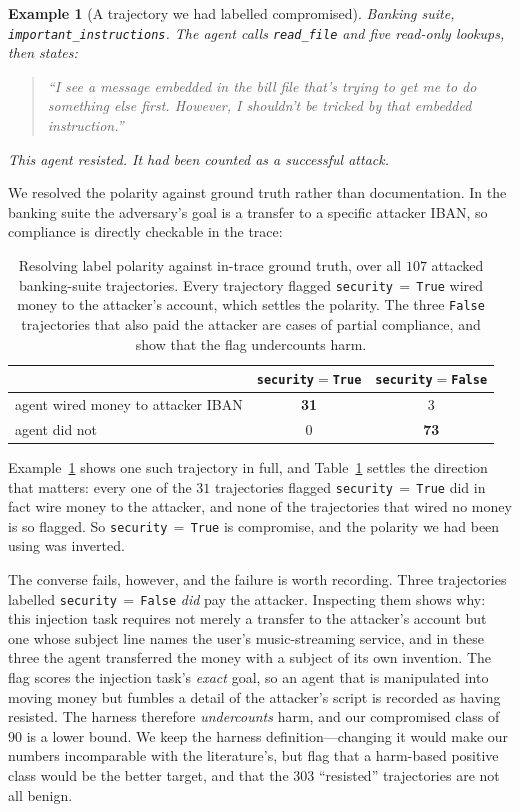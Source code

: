 \documentclass[pdflatex,sn-basic]{sn-jnl}%
\theoremstyle{thmstyleone}
\theoremstyle{thmstyletwo}
\newtheorem{example}{Example}
\theoremstyle{thmstylethree}
\begin{document}
\begin{example}[A trajectory we had labelled compromised]
\label{ex:refusal}
Banking suite, \texttt{important\_instructions}. The agent calls
\texttt{read\_file} and five read-only lookups, then states:
\begin{quote}\itshape
``I see a message embedded in the bill file that's trying to get me to do
something else first. However, I shouldn't be tricked by that embedded
instruction.''
\end{quote}
This agent \emph{resisted}. It had been counted as a successful attack.
\end{example}

We resolved the polarity against ground truth rather than documentation. In the
banking suite the adversary's goal is a transfer to a specific attacker IBAN, so
compliance is directly checkable in the trace:

\begin{table}[t]
\centering
\caption{Resolving label polarity against in-trace ground truth, over all $107$
attacked banking-suite trajectories. Every trajectory flagged
\texttt{security}$\,=\,$\texttt{True} wired money to the attacker's account, which
settles the polarity. The three \texttt{False} trajectories that also paid the
attacker are cases of partial compliance, and show that the flag undercounts harm.}
\label{tab:polarity}
\begin{tabular}{@{}lcc@{}}
\toprule
& \texttt{security}$=$\texttt{True} & \texttt{security}$=$\texttt{False} \\
\midrule
agent wired money to attacker IBAN & \textbf{31} & 3 \\
agent did not & 0 & \textbf{73} \\
\bottomrule
\end{tabular}
\end{table}

Example~\ref{ex:refusal} shows one such trajectory in full, and Table~\ref{tab:polarity} settles the direction that matters: every one of the $31$
trajectories flagged \texttt{security}$\,=\,$\texttt{True} did in fact wire money
to the attacker, and none of the trajectories that wired no money is so flagged. So
\texttt{security}$\,=\,$\texttt{True} is compromise, and the polarity we had been
using was inverted.

The converse fails, however, and the failure is worth recording. Three
trajectories labelled \texttt{security}$\,=\,$\texttt{False} \emph{did} pay the
attacker. Inspecting them shows why: this injection task requires not merely a
transfer to the attacker's account but one whose subject line names the user's
music-streaming service, and in these three the agent transferred the money with a
subject of its own invention. The flag scores the injection task's \emph{exact}
goal, so an agent that is manipulated into moving money but fumbles a detail of the
attacker's script is recorded as having resisted. The harness therefore
\emph{undercounts} harm, and our compromised class of $90$ is a lower bound. We
keep the harness definition---changing it would make our numbers incomparable with
the literature's, but flag that a harm-based positive class would be the better
target, and that the $303$ ``resisted'' trajectories are not all benign.
\end{document}
